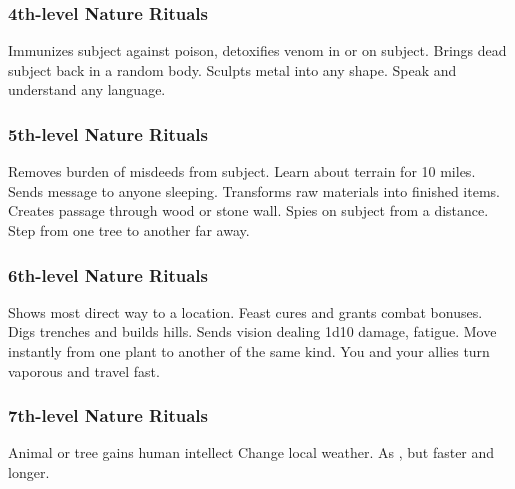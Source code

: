 \subsubsection{4th-level Nature Rituals}
\begin{rituallist}
     Immunizes subject against poison, detoxifies venom in or on subject.
     Brings dead subject back in a random body.
     Sculpts metal into any shape.
     Speak and understand any language.
\end{rituallist}

\subsubsection{5th-level Nature Rituals}
\begin{rituallist}
    \F\M Removes burden of misdeeds from subject.
     Learn about terrain for 10 miles.
     Sends message to anyone sleeping.
     Transforms raw materials into finished items.
     Creates passage through wood or stone wall.
    \F Spies on subject from a distance.
     Step from one tree to another far away.
\end{rituallist}

\subsubsection{6th-level Nature Rituals}
\begin{rituallist}
     Shows most direct way to a location.
     Feast cures and grants combat bonuses.
     Digs trenches and builds hills.
     Sends vision dealing 1d10 damage, fatigue.
     Move instantly from one plant to another of the same kind.
     You and your allies turn vaporous and travel fast.
\end{rituallist}

\subsubsection{7th-level Nature Rituals}
\begin{rituallist}
     Animal or tree gains human intellect
     Change local weather.
     As , but faster and longer.
\end{rituallist}

